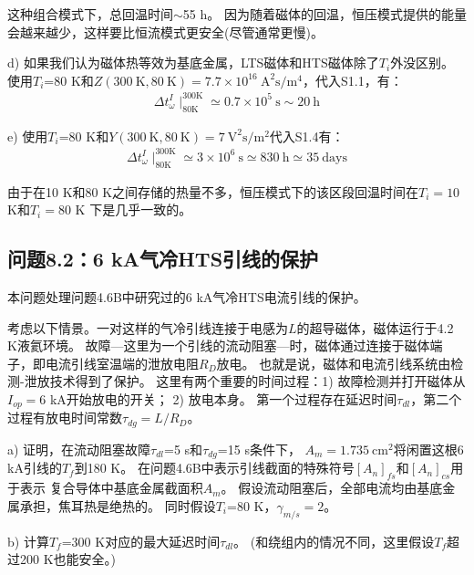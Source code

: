 这种组合模式下，总回温时间$\sim$55 h。
因为随着磁体的回温，恒压模式提供的能量会越来越少，这样要比恒流模式更安全(尽管通常更慢)。

d) 如果我们认为磁体热等效为基底金属，LTS磁体和HTS磁体除了$T_i$外没区别。
使用$T_i$=80 K和$Z(300\ \mathrm{K},80\ \mathrm{K})=7.7\times 10^{16}\ \mathrm{A^2 s/m^4}$，代入S1.1，有：
\begin{align*}%
\Delta t_{\omega}^{I}\mid_{80\mathrm{K}}^{300\mathrm{K}}\simeq 0.7\times 10^5\ \mathrm{s}\sim 20\ \mathrm{h}\tag{S1.7}
\end{align*}

e) 使用$T_i$=80 K和$Y(300\ \mathrm{K},80\ \mathrm{K})=7\ \mathrm{V^2 s/m^2}$代入S1.4有：
\begin{align*}%
\Delta t_{\omega}^{I}\mid_{80\mathrm{K}}^{300\mathrm{K}}\simeq 3\times 10^6\ \mathrm{s}\simeq 830\ \mathrm{h}\simeq 35\ \mathrm{days} \tag{S1.8}
\end{align*}

由于在10 K和80 K之间存储的热量不多，恒压模式下的该区段回温时间在$T_i=10$ K和$T_i=80$ K
下是几乎一致的。

\subsection{问题8.2：6 kA气冷HTS引线的保护}
本问题处理问题4.6B中研究过的6 kA气冷HTS电流引线的保护。

考虑以下情景。一对这样的气冷引线连接于电感为$L$的超导磁体，磁体运行于4.2 K液氦环境。
故障---这里为一个引线的流动阻塞---时，磁体通过连接于磁体端子，即电流引线室温端的泄放电阻$R_D$放电。
也就是说，磁体和电流引线系统由检测-泄放技术得到了保护。
这里有两个重要的时间过程：1) 故障检测并打开磁体从$I_{op}=$6 kA开始放电的开关；
2) 放电本身。
第一个过程存在延迟时间$\tau_{dl}$，第二个过程有放电时间常数$\tau_{dg}=L/R_D$。

a) 证明，在流动阻塞故障$\tau_{dl}$=5 s和$\tau_{dg}$=15 s条件下，
$A_m=1.735\ \mathrm{cm^2}$将闲置这根6 kA引线的$T_f$到180 K。
在问题4.6B中表示引线截面的特殊符号$[A_n]_{fs}$和$[A_n]_{cs}$用于表示
复合导体中基底金属截面积$A_m$。
假设流动阻塞后，全部电流均由基底金属承担，焦耳热是绝热的。
同时假设$T_i$=80 K，$\gamma_{m/s}=2$。

b) 计算$T_f$=300 K对应的最大延迟时间$\tau_{dl}$。
(和绕组内的情况不同，这里假设$T_f$超过200 K也能安全。)


